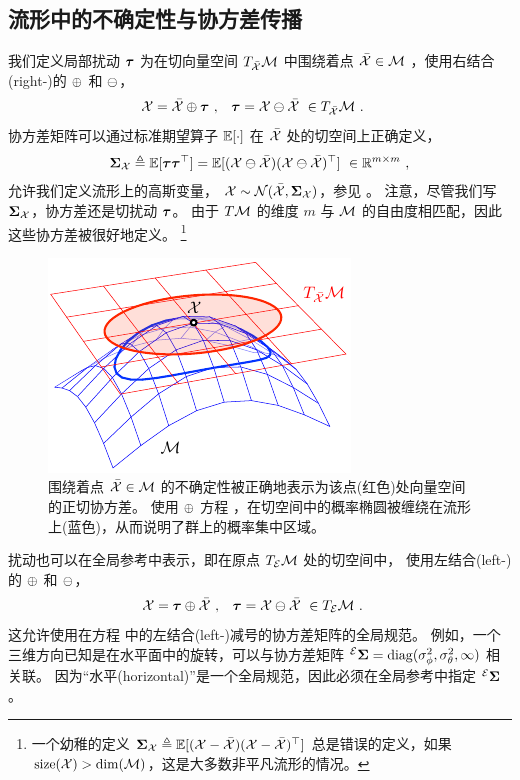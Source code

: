 \subsection[Uncertainty, covariances]{流形中的不确定性与协方差传播}

我们定义局部扰动 ${\bm \tau}$ 为在切向量空间 $T_{\bar{\mathcal{X}}}{\mathcal{M}}$ 中围绕着点 $\bar{\mathcal{X}}\in\mathcal{M}$ ，使用右结合(right-)的 $\oplus$ 和 $\ominus$，
%
\begin{align}\label{equ:uncertainty}
\mathcal{X} &= \bar{\mathcal{X}} \oplus {\bm \tau}~, & {\bm \tau} &=\mathcal{X} \ominus \bar{\mathcal{X}} ~\in T_{\bar{\mathcal{X}}}{\mathcal{M}}
~.
\end{align}
%
协方差矩阵可以通过标准期望算子 ${\mathbb E}[\cdot]$ 在 $\bar{\mathcal{X}}$ 处的切空间上正确定义，
%
\begin{align}\label{equ:cov}
{\bm \Sigma}_{\mathcal{X}} \triangleq {\mathbb E}[{\bm \tau}{\bm \tau}^{\top}] = {\mathbb E}[(\mathcal{X} \ominus \bar{\mathcal{X}})(\mathcal{X} \ominus \bar{\mathcal{X}})^{\top}]~\in{\mathbb R}^{m\times m}
~,
\end{align}
%
允许我们定义流形上的高斯变量， $\mathcal{X}\sim\mathcal{N}(\bar{\mathcal{X}},{\bm \Sigma}_{\mathcal{X}})$，参见 。
注意，尽管我们写 ${\bm \Sigma}_{\mathcal{X}}$，协方差还是切扰动 ${\bm \tau}$。
由于 $T\mathcal{M}$ 的维度 $m$ 与 $\mathcal{M}$ 的自由度相匹配，因此这些协方差被很好地定义。%
%
\footnote{%
一个幼稚的定义 ${\bm \Sigma}_{\mathcal{X}} \triangleq {\mathbb E}[(\mathcal{X} - \bar{\mathcal{X}})(\mathcal{X} - \bar{\mathcal{X}})^{\top}]$ 总是错误的定义，如果 $\mathrm{size}(\mathcal{X})>\dim(\mathcal{M})$，这是大多数非平凡流形的情况。%
}

\begin{figure}[tb]
\centering
\includegraphics{figures/covariance}
\caption{围绕着点 $\bar{\mathcal{X}}\in\mathcal{M}$ 的不确定性被正确地表示为该点(红色)处向量空间的正切协方差。
使用 $\oplus$ 方程 ，在切空间中的概率椭圆被缠绕在流形上(蓝色)，从而说明了群上的概率集中区域。}
\label{fig:covariance}
\end{figure}




扰动也可以在全局参考中表示，即在原点 $T_{\mathcal{E}}{\mathcal{M}}$ 处的切空间中，
使用左结合(left-)的 $\oplus$ 和 $\ominus$，
%
\begin{align}\label{equ:uncertainty_left}
\mathcal{X} &= {\bm \tau}\oplus\bar{\mathcal{X}}~, & {\bm \tau} &=\mathcal{X} \ominus \bar{\mathcal{X}} ~\in T_{\mathcal{E}}{\mathcal{M}}
~.
\end{align}
%
这允许使用在方程  中的左结合(left-)减号的协方差矩阵的全局规范。
例如，一个三维方向已知是在水平面中的旋转，可以与协方差矩阵 $^{\mathcal{E}}{\bm \Sigma}=\operatorname*{diag}(\sigma_\phi^2,\sigma_\theta^2, \infty)$ 相关联。
因为“水平(horizontal)”是一个全局规范，因此必须在全局参考中指定 $^{\mathcal{E}}{\bm \Sigma}$ 。

